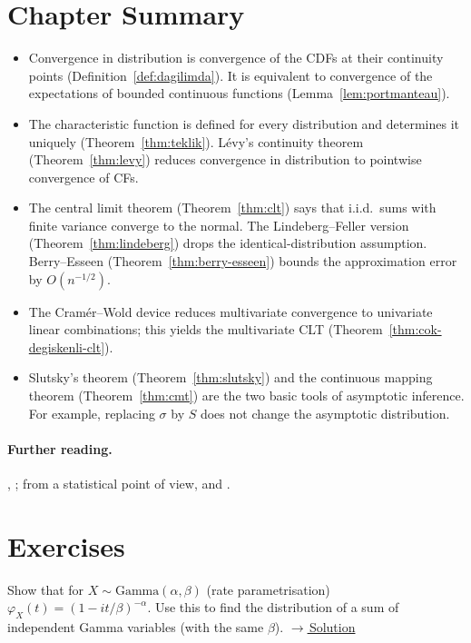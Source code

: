 \documentclass[main.tex]{subfiles}
\begin{document}
\section{Chapter Summary}
\begin{summary}
\begin{itemize}
  \item Convergence in distribution is convergence of the CDFs at their continuity points (Definition~\ref{def:dagilimda}). It is equivalent to convergence of the expectations of bounded continuous functions (Lemma~\ref{lem:portmanteau}).
  \item The characteristic function is defined for every distribution and determines it uniquely (Theorem~\ref{thm:teklik}). Lévy's continuity theorem (Theorem~\ref{thm:levy}) reduces convergence in distribution to pointwise convergence of CFs.
  \item The central limit theorem (Theorem~\ref{thm:clt}) says that i.i.d.\ sums with finite variance converge to the normal. The Lindeberg--Feller version (Theorem~\ref{thm:lindeberg}) drops the identical-distribution assumption. Berry--Esseen (Theorem~\ref{thm:berry-esseen}) bounds the approximation error by $O(n^{-1/2})$.
  \item The Cramér--Wold device reduces multivariate convergence to univariate linear combinations; this yields the multivariate CLT (Theorem~\ref{thm:cok-degiskenli-clt}).
  \item Slutsky's theorem (Theorem~\ref{thm:slutsky}) and the continuous mapping theorem (Theorem~\ref{thm:cmt}) are the two basic tools of asymptotic inference. For example, replacing $\sigma$ by $S$ does not change the asymptotic distribution.
\end{itemize}
\end{summary}

\paragraph{Further reading.} \cite[Chapter~3]{durrett}, \cite[Sections~25--27]{billingsley}; from a statistical point of view, \cite[Chapters~2--3]{vdv} and \cite{ferguson}.

\section{Exercises}

\begin{exercise}\label{exr:06-1}
Show that for $X\sim\text{Gamma}(\alpha,\beta)$ (rate parametrisation) $\varphi_X(t)=(1-it/\beta)^{-\alpha}$. Use this to find the distribution of a sum of independent Gamma variables (with the same $\beta$).
\hfill\hyperref[coz:06-1]{\footnotesize$\rightarrow$\,Solution}
\end{exercise}
\end{document}
